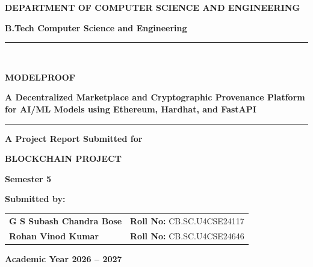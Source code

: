\documentclass[12pt,a4paper]{article}
\begin{document}
\begin{titlepage}
    \thispagestyle{empty}
    \centering
    
    \vspace*{0.5cm}
    
    {\Large \bfseries DEPARTMENT OF COMPUTER SCIENCE AND ENGINEERING \par}
    \vspace{0.4cm}
    {\large \textbf{B.Tech Computer Science and Engineering} \par}
    
    \vspace{1.8cm}
    
    \rule{\linewidth}{1.2pt} \\[0.4cm]
    {\Huge \bfseries MODELPROOF \par}
    \vspace{0.3cm}
    {\Large \textbf{A Decentralized Marketplace and Cryptographic Provenance Platform for AI/ML Models using Ethereum, Hardhat, and FastAPI} \par}
    \rule{\linewidth}{1.2pt}
    
    \vspace{1.8cm}
    
    {\large \textbf{A Project Report Submitted for} \par}
    \vspace{0.2cm}
    {\Large \bfseries BLOCKCHAIN PROJECT \par}
    \vspace{0.3cm}
    {\large \textbf{Semester 5} \par}
    
    \vspace{2.2cm}
    
    {\large \textbf{Submitted by:} \par}
    \vspace{0.4cm}
    
    \begin{table}[H]
        \centering
        \large
        \renewcommand{\arraystretch}{1.3}
        \begin{tabular}{ll}
            \textbf{G S Subash Chandra Bose} & \textbf{Roll No:} CB.SC.U4CSE24117 \\
            \textbf{Rohan Vinod Kumar}       & \textbf{Roll No:} CB.SC.U4CSE24646 \\
        \end{tabular}
    \end{table}
    
    \vfill
    
    {\large \textbf{Academic Year 2026 -- 2027} \par}
    \vspace{0.5cm}
\end{titlepage}
\end{document}
